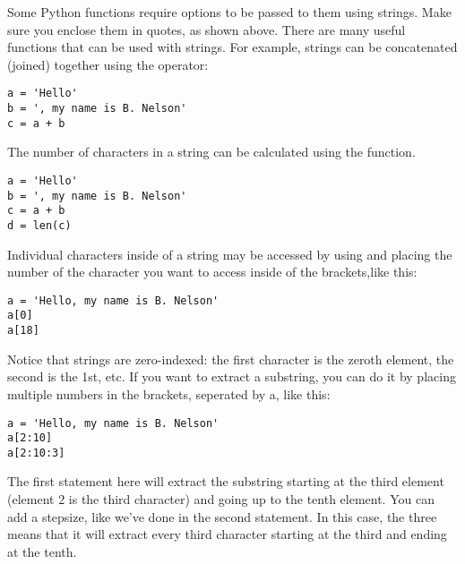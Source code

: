 Some Python functions require options to be passed to them using
strings. Make sure you enclose them in quotes, as shown
above.  There are many useful functions that can be used with strings.
For example, strings can be concatenated (joined) together using the
\code{+} operator:
\begin{Verbatim}
a = 'Hello'
b = ', my name is B. Nelson'
c = a + b
\end{Verbatim}
The number of characters in a string can be calculated using the
 function.
\begin{Verbatim}
a = 'Hello'
b = ', my name is B. Nelson'
c = a + b
d = len(c)
\end{Verbatim}
Individual characters inside of a string may be accessed  by using
\code{[]} and placing the number of the character you want to access
inside of the brackets,like this:
\begin{Verbatim}
a = 'Hello, my name is B. Nelson'
a[0]
a[18]
\end{Verbatim}
Notice that strings are zero-indexed: the first character is the
zeroth element, the second is the 1st, etc.  If you want to extract a
substring, you can do it by placing multiple numbers in the brackets,
seperated by a\code{:}, like this:
\begin{Verbatim}
a = 'Hello, my name is B. Nelson'
a[2:10]
a[2:10:3]
\end{Verbatim}
The first statement here will extract the substring starting at the
third element (element 2 is the third character) and going up to the
tenth element.  You can add a stepsize, like we've done in the second
statement.  In this case, the three means that it will extract every
third character starting at the third and ending at the tenth.
